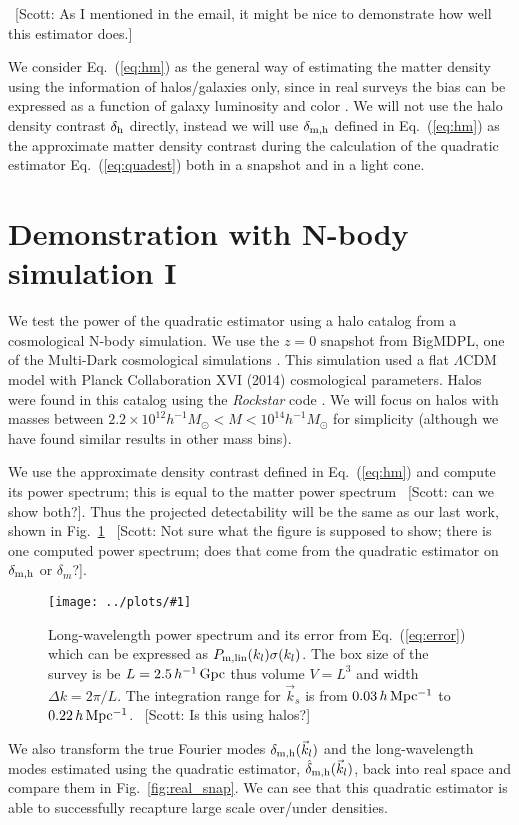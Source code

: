 \documentclass[prd,amsmath,amssymb,floatfix,superscriptaddress,nofootinbib,twocolumn]{revtex4-1}
\newcommand{\vk}{\vec{k}}
\newcommand{\ec}[1]{Eq.~(\ref{eq:#1})}
\newcommand{\rf}[1]{\ref{fig:#1}}
\newcommand{\sfig}[2]{
\texttt{[image: ../plots/\#1]}
        }
\newcommand{\Sfig}[2]{
   \begin{figure}[thbp]
   \begin{center}
    \sfig{../plots/#1.pdf}{\columnwidth}
    \caption{{\small #2}}
    \label{fig:#1}
     \end{center}
   \end{figure}
}
\newcommand{\scott}[1]{{\color{darkgreen} \, [Scott: #1]}}
\newcommand\dmh{\delta_{\rm m,h}}
\newcommand\hdmh{\hat{\delta}_{\rm m,h}}
\begin{document}
\scott{As I mentioned in the email, it might be nice to demonstrate how well this estimator does.} 

We consider \ec{hm} as the general way of estimating the matter density using the information of halos/galaxies only, since in real surveys the bias can be expressed as a function of galaxy luminosity and color \cite{Cresswell:2008Col}. We will not use the halo density contrast $\delta_{\rm h}$ directly, instead we will use $\dmh$ defined in \ec{hm} as the approximate matter density contrast during the calculation of the quadratic estimator \ec{quadest} both in a snapshot and in a light cone.

\section{Demonstration with N-body simulation I} \label{sec3}
\noindent We test the power of the quadratic estimator using a halo catalog from a cosmological N-body simulation. We use the $z=0$ snapshot from BigMDPL, one of the Multi-Dark cosmological simulations \cite{Klypin:2014nov}. This simulation used a flat $\Lambda$CDM model with Planck Collaboration XVI (2014) \cite{Planck:2014cos} cosmological parameters. Halos were found in this catalog using the \textit{Rockstar} code \cite{Behroozi:2013Rock}. We will focus on halos with masses between $2.2 \times 10^{12}h^{-1}M_{\odot}<M < 10^{14}h^{-1}M_{\odot}$ for simplicity (although we have found similar results in other mass bins).

We use the approximate density contrast defined in \ec{hm} and compute its power spectrum; this is equal to the matter power spectrum \scott{can we show both?}. Thus the projected detectability will be the same as our last work, shown in Fig.~\rf{SN_BIGMDPL} \scott{Not sure what the figure is supposed to show; there is one computed power spectrum; does that come from the quadratic estimator on $\dmh$ or $\delta_m$?}.

\Sfig{SN_BIGMDPL}{Long-wavelength power spectrum and its error from \ec{error} which can be expressed as $P_{\rm m, lin}(k_l)\sigma(k_l)$. The box size of the survey is be $L=2.5\, h^{-1}\rm\, Gpc$ thus volume $V=L^3$ and width $\Delta k = 2\pi/L$. The integration range for $\vk_s$ is from $0.03 \,h \,\rm Mpc^{-1}$ to $0.22\,h\,\rm Mpc^{-1}$.\scott{Is this using halos?}}

We also transform the true Fourier modes $\dmh(\vk_l)$ and the long-wavelength modes estimated using the quadratic estimator, $\hdmh(\vk_l)$, back into real space and compare them in Fig.~\rf{real_snap}. We can see that this quadratic estimator is able to successfully recapture large scale over/under densities. 
 
\end{document}
